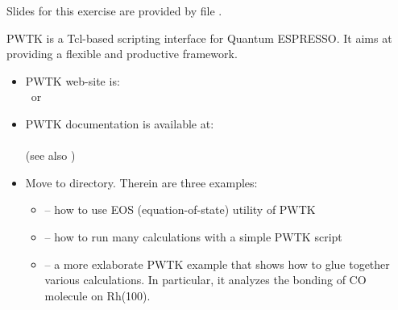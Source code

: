 \documentclass[landscape]{foils}
\begin{document}
Slides for this exercise are provided by file .
%


PWTK is a Tcl-based scripting interface for Quantum ESPRESSO. It aims
at providing a flexible and productive framework.

\begin{itemize}
\item PWTK web-site is:\\
   ~or~ 
\item PWTK documentation is available at:\\
  \\
  (see also )
\end{itemize}

\begin{itemize}
\item  Move to  directory. Therein are three
  examples:
  \begin{itemize}
  \item {} -- how to use EOS (equation-of-state) utility
    of PWTK
    \vspace{0.5em}
  \item {} -- how to run many calculations with a
    simple PWTK script
    \vspace{0.5em}
  \item {} -- a more exlaborate PWTK example that
    shows how to glue together various calculations. In particular, it
    analyzes the bonding of CO molecule on Rh(100).
  \end{itemize}
\end{itemize}

\rightheader{}
\end{document}
